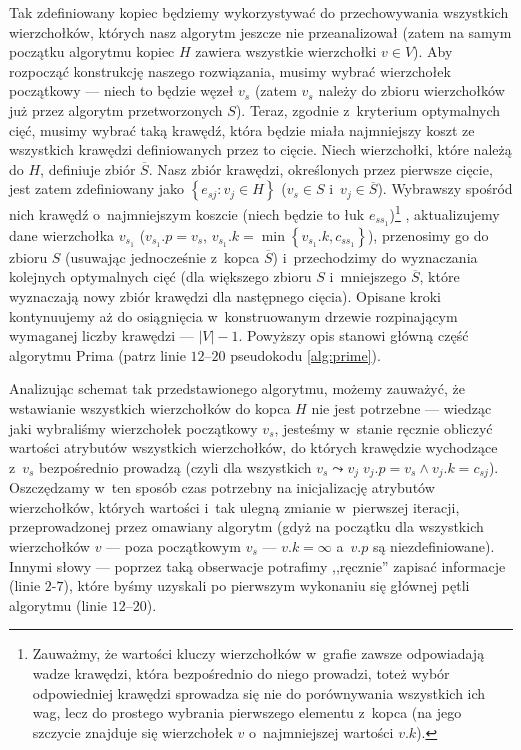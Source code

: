 Tak zdefiniowany kopiec będziemy wykorzystywać do przechowywania wszystkich wierzchołków, których nasz algorytm jeszcze nie przeanalizował (zatem na samym początku algorytmu kopiec $H$ zawiera wszystkie wierzchołki $v \in V$).
Aby rozpocząć konstrukcję naszego rozwiązania, musimy wybrać wierzchołek początkowy --- niech to będzie węzeł $v_{s}$ (zatem $v_{s}$ należy do zbioru wierzchołków już przez algorytm przetworzonych $S$).
Teraz, zgodnie z~kryterium optymalnych cięć, musimy wybrać taką krawędź, która będzie miała najmniejszy koszt ze wszystkich krawędzi definiowanych przez to cięcie.
Niech wierzchołki, które należą do $H$, definiuje zbiór $\overline{S}$.
Nasz zbiór krawędzi, określonych przez pierwsze cięcie, jest zatem zdefiniowany jako $\left\{ e_{sj} : v_{j} \in H \right\}$ ($v_{s} \in S$ i~$v_{j} \in \overline{S}$).
Wybrawszy spośród nich krawędź o~najmniejszym koszcie (niech będzie to łuk $e_{ss_{1}}$)\footnote{
	Zauważmy, że wartości kluczy wierzchołków w~grafie zawsze odpowiadają wadze krawędzi, która bezpośrednio do niego prowadzi, toteż wybór odpowiedniej krawędzi sprowadza się nie do porównywania wszystkich ich wag, lecz do prostego wybrania pierwszego elementu z~kopca (na jego szczycie znajduje się wierzchołek $v$ o~najmniejszej wartości $v.k$).}
, aktualizujemy dane wierzchołka $v_{s_{1}}$ ($v_{s_{1}}.p = v_{s}$, $v_{s_{1}}.k = \min \left\{ v_{s_{1}}.k, c_{ss_{1}} \right\}$), przenosimy go do zbioru $S$ (usuwając jednocześnie z~kopca $\overline{S}$) i~przechodzimy do wyznaczania kolejnych optymalnych cięć (dla większego zbioru $S$ i~mniejszego $\overline{S}$, które wyznaczają nowy zbiór krawędzi dla następnego cięcia).
Opisane kroki kontynuujemy aż do osiągnięcia w~konstruowanym drzewie rozpinającym wymaganej liczby krawędzi --- $\left| V \right| - 1$.
Powyższy opis stanowi główną część algorytmu Prima (patrz linie $12$--$20$ pseudokodu \ref{alg:prime}).

Analizując schemat tak przedstawionego algorytmu, możemy zauważyć, że wstawianie wszystkich wierzchołków do kopca $H$ nie jest potrzebne --- wiedząc jaki wybraliśmy wierzchołek początkowy $v_{s}$, jesteśmy w~stanie ręcznie obliczyć wartości atrybutów wszystkich wierzchołków, do których krawędzie wychodzące z~$v_{s}$ bezpośrednio prowadzą (czyli dla wszystkich $v_{s} \leadsto v_{j} \; v_{j}.p = v_{s} \wedge v_{j}.k = c_{sj}$).
Oszczędzamy w~ten sposób czas potrzebny na inicjalizację atrybutów wierzchołków, których wartości i~tak ulegną zmianie w~pierwszej iteracji, przeprowadzonej przez omawiany algorytm (gdyż na początku dla wszystkich wierzchołków $v$ --- poza początkowym $v_{s}$ --- $v.k = \infty$ a~$v.p$ są niezdefiniowane).
Innymi słowy --- poprzez taką obserwacje potrafimy ,,ręcznie'' zapisać informacje (linie $2$-$7$), które byśmy uzyskali po pierwszym wykonaniu się głównej pętli algorytmu (linie $12$--$20$).

